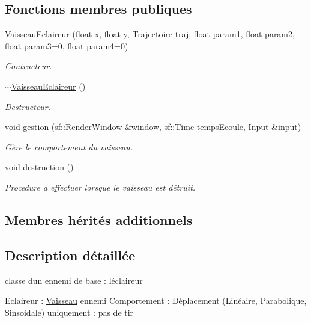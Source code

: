 \subsection*{Fonctions membres publiques}
\begin{DoxyCompactItemize}
\item 
\hyperlink{class_vaisseau_eclaireur_ab65919df2049e350f83a77b625870fcc}{Vaisseau\+Eclaireur} (float x, float y, \hyperlink{_trajectoire_8h_afa7f6e8323d7ee755d93cd1f6019dd95}{Trajectoire} traj, float param1, float param2, float param3=0, float param4=0)
\begin{DoxyCompactList}\small\item\em Contructeur. \end{DoxyCompactList}\item 
\hyperlink{class_vaisseau_eclaireur_a3e7ef82ff40bf4736d4285311dd8624c}{$\sim$\+Vaisseau\+Eclaireur} ()
\begin{DoxyCompactList}\small\item\em Destructeur. \end{DoxyCompactList}\item 
void \hyperlink{class_vaisseau_eclaireur_aac6158ee2ff8454a93515546cb1be1de}{gestion} (sf\+::\+Render\+Window \&window, sf\+::\+Time temps\+Ecoule, \hyperlink{_input_8h_a5588d60d674991c719a8df848313e966}{Input} \&input)
\begin{DoxyCompactList}\small\item\em Gère le comportement du vaisseau. \end{DoxyCompactList}\item 
void \hyperlink{class_vaisseau_eclaireur_a4f65343b67301d7fa98f5e02337cc1e1}{destruction} ()
\begin{DoxyCompactList}\small\item\em Procedure a effectuer lorsque le vaisseau est détruit. \end{DoxyCompactList}\end{DoxyCompactItemize}
\subsection*{Membres hérités additionnels}


\subsection{Description détaillée}
classe d\textquotesingle{}un ennemi de base \+: l\textquotesingle{}éclaireur 

Eclaireur \+: \hyperlink{class_vaisseau}{Vaisseau} ennemi Comportement \+: Déplacement (Linéaire, Parabolique, Sinsoidale) uniquement \+: pas de tir 

